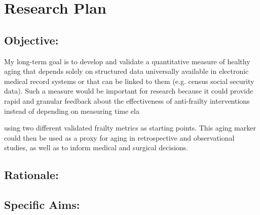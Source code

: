 \section{Research Plan }\label{research-plan}


\subsection{Objective:}\label{objective}
  
My long-term goal is to develop and validate a quantitative measure of healthy aging that depends solely on structured data universally available in electronic medical record systems or that can be linked to them (e.g. census social security data). Such a measure would be important for research because it could provide rapid and granular feedback about the effectiveness of anti-frailty interventions instead of depending on measuring time ela

using two different validated frailty metrics as starting points. This
aging marker could then be used as a proxy for aging in retrospective
and observational studies, as well as to inform medical and surgical
decisions.


\subsection{Rationale:}\label{rationale}

\subsection{Specific Aims:}\label{specific-aims}
